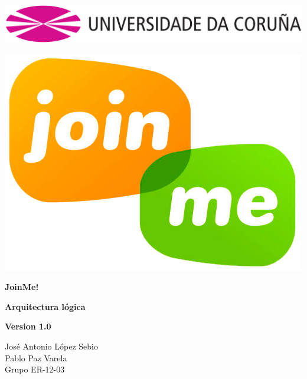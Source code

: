 \documentclass[12pt, a4paper, titlepage]{article}
\begin{document}

\begin{titlepage}

\includegraphics[width=15cm]{Imagenes/Simbolo_logo_UDC.png}

\vspace{3cm}

\begin{center}
\includegraphics[scale=0.3]{Imagenes/1a_Practica_ER_14-15.png}
\end{center}


\begin{flushright}
	
	\LARGE{\textbf{ JoinMe!}}
	
	\LARGE{\textbf{Arquitectura lógica}}
	
	\large{\textbf{Version 1.0}}
	
\end{flushright}

\vspace{1cm}
\begin{center}
José Antonio López Sebio\\
Pablo Paz Varela\\
Grupo ER-12-03\\
\end{center}


\end{titlepage}
\end{document}
